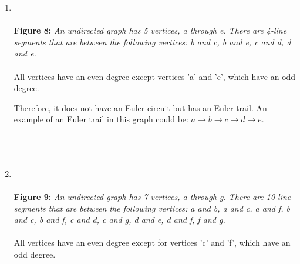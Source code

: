 \documentclass{amsart}
\theoremstyle{definition}
\theoremstyle{Exercise}
\theoremstyle{remark}
\theoremstyle{rule}
\numberwithin{equation}{section}
\begin{document}
\begin{enumerate}[label=(\alph{*})]
		\item {} \\\\
			{\color{blue} {\bf Figure 8: } \emph{An undirected graph has 5 vertices, a through e. There are 4-line segments that are between the following vertices: b and c, b and e, c and d, d and e. } }
			\\\\
			All vertices have an even degree except vertices 'a' and 'e', which have
			an odd degree.

			Therefore, it does not have an Euler circuit but has an Euler trail. An
			example of an Euler trail in this graph could be: $a \rightarrow b \rightarrow
			c \rightarrow d \rightarrow e$. \\\\
			\newpage
			~\\~\\

		\item {} \\\\
			{\color{blue} {\bf Figure 9:} \emph{An undirected graph has 7 vertices, a through g. There are 10-line segments that are between the following vertices: a and b, a and c, a and f, b and c, b and f, c and d, c and g, d and e, d and f, f and g. } }
			\\\\
			All vertices have an even degree except for vertices 'c' and 'f', which
			have an odd degree.


\end{enumerate}
\end{document}
